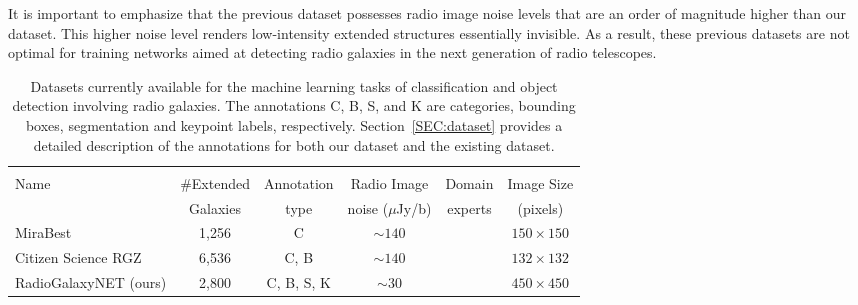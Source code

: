 \documentclass[
  journal=pasa,
  manuscript=research-paper, %
  year=2020,
  volume=37,
]{cup-journal}
\newcommand{\cmark}{\ding{51}}%
\newcommand{\xmark}{\ding{55}}%
\begin{document}
It is important to emphasize that the previous dataset possesses radio image noise levels that are an order of magnitude higher than our dataset. This higher noise level renders low-intensity extended structures essentially invisible. As a result, these previous datasets are not optimal for training networks aimed at detecting radio galaxies in the next generation of radio telescopes. 
\begin{table*}
  \caption{Datasets currently available for the machine learning tasks of classification and object detection involving radio galaxies. The annotations C, B, S, and K are categories, bounding boxes, segmentation and keypoint labels, respectively.
  Section~\ref{SEC:dataset} provides a detailed description of the annotations for both our dataset and the existing dataset.}
  \label{sample-table}
  \centering
  \begin{tabular}{lccccc}
    \toprule \\
    Name                    & \#Extended & Annotation      & Radio Image & Domain  & Image Size\\
                            & Galaxies  & type        & noise ($\mu$Jy/b) & experts      & (pixels)\\
    \midrule
    MiraBest                & 1,256     & C           & $\sim140$  & \cmark & $150\times150$\\
    Citizen Science RGZ     & 6,536     & C, B        & $\sim140$  & \xmark & $132\times132$\\
    RadioGalaxyNET (ours)   & 2,800      & C, B, S, K  & $\sim30$   & \cmark & $450\times450$\\
    \bottomrule
  \end{tabular}
  \label{TAB:DataComparison}
\end{table*}
\end{document}
